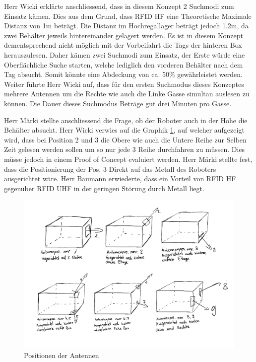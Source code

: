 \documentclass[parskip=full, a4paper]{scrreprt}
\begin{document}
Herr Wicki erklärte anschliessend, dass in diesem Konzept 2 Suchmodi zum Einsatz kämen. Dies aus dem Grund, dass RFID HF eine Theoretische Maximale Distanz von 1m beträgt. Die Distanz im Hochregallager beträgt jedoch 1.2m, da zwei Behälter jeweils hintereinander gelagert werden. Es ist in diesem Konzept dementsprechend nicht möglich mit der Vorbeifahrt die Tags der hinteren Box herauszulesen. Daher kämen zwei Suchmodi zum Einsatz, der Erste würde eine Oberflächliche Suche starten, welche lediglich den vorderen Behälter nach dem Tag absucht. Somit könnte eine Abdeckung von ca. 50\% gewährleistet werden. 
Weiter führte Herr Wicki auf, dass für den ersten Suchmodus dieses Konzeptes mehrere Antennen um die Rechte wie auch die Linke Gasse simultan auslesen zu können. Die Dauer dieses Suchmodus Beträge gut drei Minuten pro Gasse. 

Herr Märki stellte anschliessend die Frage, ob der Roboter auch in der Höhe die Behälter absucht. Herr Wicki verwies auf die Graphik \ref{fig:antennenpos}, auf welcher aufgezeigt wird, dass bei Position 2 und 3 die Obere wie auch die Untere Reihe zur Selben Zeit gelesen werden sollen um so nur jede 3 Reihe durchfahren zu müssen. Dies müsse jedoch in einem Proof of Concept evaluiert werden.
Herr Märki stellte fest, dass die Positionierung der Pos. 3 Direkt auf das Metall des Roboters ausgerichtet wäre. Herr Baumann erwiederte, dass ein Vorteil von RFID HF gegenüber RFID UHF in der geringen Störung durch Metall liegt.

\begin{figure}
	\centering
	\includegraphics[keepaspectratio, width=0.8\linewidth]{images/Konzept_1_Drawings3.pdf}
	\caption{Positionen der Antennen}
	\label{fig:antennenpos}
\end{figure}
\end{document}
